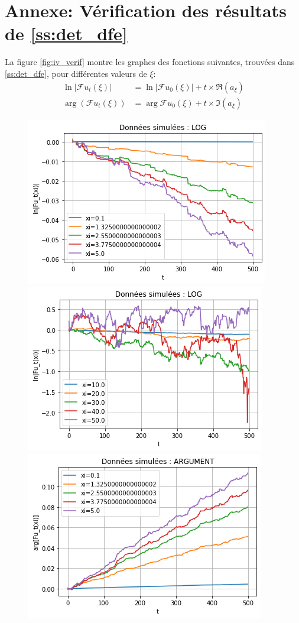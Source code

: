\documentclass[12pt]{article}
\newcommand{\pth}[1]{\left(#1\right)}
\newcommand{\abs}[1]{\left|#1\right|}
\newcommand{\fr}{\mathcal{F}}
\begin{document}
\newpage

\section{Annexe: Vérification des résultats de \ref{ss:det_dfe}\label{ann:verif}}

La figure \ref{fig:iv_verif} montre les graphes des fonctions suivantes, trouvées dans \ref{ss:det_dfe}, pour différentes valeurs de $\xi$:
\begin{align*}
  \ln\abs{\fr u_t(\xi)}&=\ln\abs{\fr u_0(\xi)}+t\times\Re(a_{\xi})\\
  \arg\pth{\fr u_t(\xi)}&=\arg{\fr u_0(\xi)}+t\times\Im(a_{\xi})
\end{align*}

\begin{figure}[h]
  \begin{center}
    \includegraphics[scale=0.6]{img/iv_verif_pxi.png}
    \includegraphics[scale=0.6]{img/iv_verif_grxi.png}
    \includegraphics[scale=0.6]{img/iv_verif_pxi_im.png}

\end{center}
\end{figure}
\end{document}
